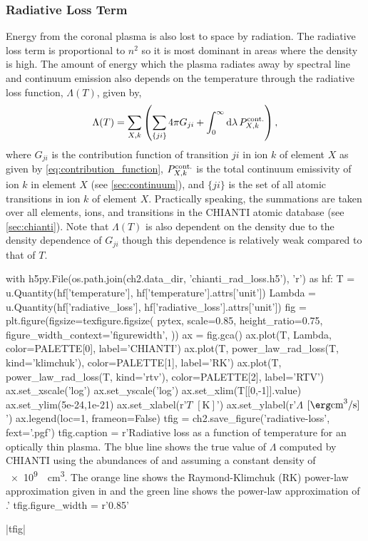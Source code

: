 \subsubsection{Radiative Loss Term}\label{sec:rad-loss}

Energy from the coronal plasma is also lost to space by radiation. The radiative loss term is proportional to $n^2$ so it is most dominant in areas where the density is high. The amount of energy which the plasma radiates away by spectral line and continuum emission also depends on the temperature through the radiative loss function, $\Lambda(T)$, given by,
\begin{equation}\label{eq:rad-loss}
    \Lambda(T) = \sum_{X,k}\left(\sum_{\{ji\}}4\pi G_{ji}  + \int_0^\infty\textup{d}\lambda\,P_{X,k}^\textup{cont.} \right),
\end{equation}
where $G_{ji}$ is the contribution function of transition $ji$ in ion $k$ of element $X$ as given by \autoref{eq:contribution_function}, $P_{X,k}^\textup{cont.}$ is the total continuum emissivity of ion $k$ in element $X$ (see \autoref{sec:continuum}), and $\{ji\}$ is the set of all atomic transitions in ion $k$ of element $X$. Practically speaking, the summations are taken over all elements, ions, and transitions in the CHIANTI atomic database (see \autoref{sec:chianti}). Note that $\Lambda(T)$ is also dependent on the density due to the density dependence of $G_{ji}$ though this dependence is relatively weak compared to that of $T$.

\begin{pycode}[chapter2]
with h5py.File(os.path.join(ch2.data_dir, 'chianti_rad_loss.h5'), 'r') as hf:
    T = u.Quantity(hf['temperature'], hf['temperature'].attrs['unit'])
    Lambda = u.Quantity(hf['radiative_loss'], hf['radiative_loss'].attrs['unit'])
fig = plt.figure(figsize=texfigure.figsize(
    pytex,
    scale=0.85,
    height_ratio=0.75,
    figure_width_context='figurewidth',
))
ax = fig.gca()
ax.plot(T, Lambda, color=PALETTE[0], label='CHIANTI')
ax.plot(T, power_law_rad_loss(T, kind='klimchuk'), color=PALETTE[1], label='RK')
ax.plot(T, power_law_rad_loss(T, kind='rtv'), color=PALETTE[2], label='RTV')
ax.set_xscale('log')
ax.set_yscale('log')
ax.set_xlim(T[[0,-1]].value)
ax.set_ylim(5e-24,1e-21)
ax.set_xlabel(r'$T$ $[\si{\kelvin}]$')
ax.set_ylabel(r'$\Lambda$ $[\si{\erg\cubic\cm\per\second}]$')
ax.legend(loc=1, frameon=False)
tfig = ch2.save_figure('radiative-loss', fext='.pgf')
tfig.caption = r'Radiative loss as a function of temperature for an optically thin plasma. The blue line shows the true value of $\Lambda$ computed by CHIANTI using the abundances of \citet{feldman_potential_1992} and assuming a constant density of \SI{e9}{\per\cubic\cm}. The orange line shows the Raymond-Klimchuk (RK) power-law approximation given in \citet{klimchuk_highly_2008} and the green line shows the power-law approximation of \citet[RTV]{rosner_dynamics_1978}.'
tfig.figure_width = r'0.85\textwidth'
\end{pycode}
\py[chapter2]|tfig|

